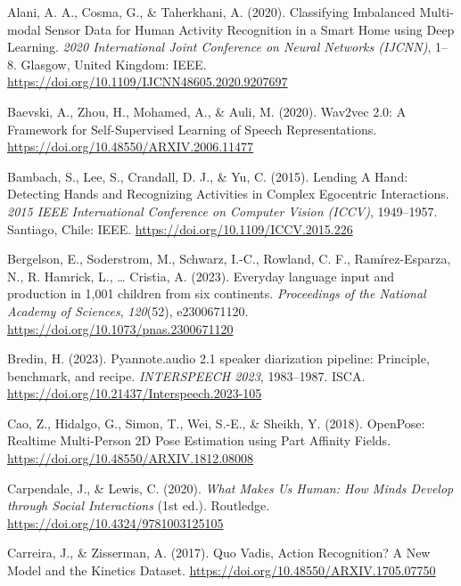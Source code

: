 \documentclass[
  man,floatsintext]{apa6}
\newlength{\cslhangindent}
\newenvironment{CSLReferences}[2] %
 {\begin{list}{}{%
  \setlength{\itemindent}{0pt}
  \setlength{\leftmargin}{0pt}
  \setlength{\parsep}{0pt}
  \ifodd #1
   \setlength{\leftmargin}{\cslhangindent}
   \setlength{\itemindent}{-1\cslhangindent}
  \fi
  \setlength{\itemsep}{#2\baselineskip}}}
 {\end{list}}
\begin{document}
\label{refs}
\begin{CSLReferences}{1}{0}
Alani, A. A., Cosma, G., \& Taherkhani, A. (2020). Classifying {Imbalanced Multi-modal Sensor Data} for {Human Activity Recognition} in a {Smart Home} using {Deep Learning}. \emph{2020 {International Joint Conference} on {Neural Networks} ({IJCNN})}, 1--8. Glasgow, United Kingdom: IEEE. \url{https://doi.org/10.1109/IJCNN48605.2020.9207697}

Baevski, A., Zhou, H., Mohamed, A., \& Auli, M. (2020). Wav2vec 2.0: {A Framework} for {Self-Supervised Learning} of {Speech Representations}. \url{https://doi.org/10.48550/ARXIV.2006.11477}

Bambach, S., Lee, S., Crandall, D. J., \& Yu, C. (2015). Lending {A Hand}: {Detecting Hands} and {Recognizing Activities} in {Complex Egocentric Interactions}. \emph{2015 {IEEE International Conference} on {Computer Vision} ({ICCV})}, 1949--1957. Santiago, Chile: IEEE. \url{https://doi.org/10.1109/ICCV.2015.226}

Bergelson, E., Soderstrom, M., Schwarz, I.-C., Rowland, C. F., Ramírez-Esparza, N., R. Hamrick, L., \ldots{} Cristia, A. (2023). Everyday language input and production in 1,001 children from six continents. \emph{Proceedings of the National Academy of Sciences}, \emph{120}(52), e2300671120. \url{https://doi.org/10.1073/pnas.2300671120}

Bredin, H. (2023). Pyannote.audio 2.1 speaker diarization pipeline: Principle, benchmark, and recipe. \emph{{INTERSPEECH} 2023}, 1983--1987. ISCA. \url{https://doi.org/10.21437/Interspeech.2023-105}

Cao, Z., Hidalgo, G., Simon, T., Wei, S.-E., \& Sheikh, Y. (2018). {OpenPose}: {Realtime Multi-Person 2D Pose Estimation} using {Part Affinity Fields}. \url{https://doi.org/10.48550/ARXIV.1812.08008}

Carpendale, J., \& Lewis, C. (2020). \emph{What {Makes Us Human}: {How Minds Develop} through {Social Interactions}} (1st ed.). Routledge. \url{https://doi.org/10.4324/9781003125105}

Carreira, J., \& Zisserman, A. (2017). Quo {Vadis}, {Action Recognition}? {A New Model} and the {Kinetics Dataset}. \url{https://doi.org/10.48550/ARXIV.1705.07750}


\end{CSLReferences}
\end{document}
